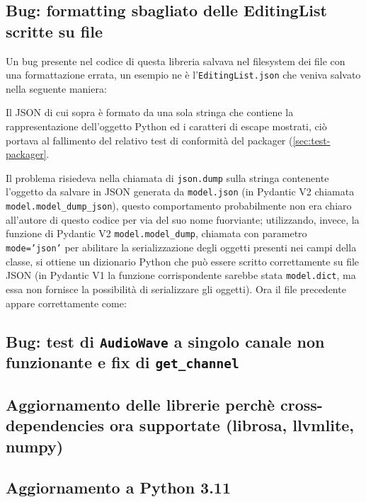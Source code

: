 \subsection{Bug: formatting sbagliato delle EditingList scritte su file} \label{ssec:mpaicaearp-editinglist-format}
Un bug presente nel codice di questa libreria salvava nel filesystem dei file con una formattazione errata, un esempio ne è l'\texttt{EditingList.json} che veniva salvato nella seguente maniera:

Il JSON di cui sopra è formato da una sola stringa che contiene la rappresentazione dell'oggetto Python ed i caratteri di escape mostrati, ciò portava al fallimento del relativo test di conformità del packager (\ref{sec:test-packager}.

Il problema risiedeva nella chiamata di \texttt{json.dump} sulla stringa contenente l'oggetto da salvare in JSON generata da \texttt{model.json} (in Pydantic V2 chiamata \verb|model.model_dump_json|), questo comportamento probabilmente non era chiaro all'autore di questo codice per via del suo nome fuorviante; utilizzando, invece, la funzione di Pydantic V2 \verb|model.model_dump|, chiamata con parametro \texttt{mode='json'} per abilitare la serializzazione degli oggetti presenti nei campi della classe, si ottiene un dizionario Python che può essere scritto correttamente su file JSON (in Pydantic V1 la funzione corrispondente sarebbe stata \texttt{model.dict}, ma essa non fornisce la possibilità di serializzare gli oggetti).
Ora il file precedente appare correttamente come:



\subsection{Bug: test di \texttt{AudioWave} a singolo canale non funzionante e fix di \texttt{get\_channel}}    %





\subsection{Aggiornamento delle librerie perchè cross-dependencies ora supportate (librosa, llvmlite, numpy)}
\subsection{Aggiornamento a Python 3.11} \label{ssec:py-311}
